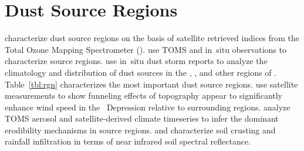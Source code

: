 \documentclass[12pt,twoside]{book}
\begin{document}
\section[Dust Source Regions]{Dust Source Regions}\label{sxn:rgn}
\cite{PGT02} characterize dust source regions on the basis of
satellite retrieved indices from the Total Ozone Mapping Spectrometer
().
\cite{WTM03} use TOMS and in~situ observations to characterize source
regions.
\cite{SZL01} use in~situ dust storm reports to analyze the climatology
and distribution of dust sources in the ,
, and other regions of .
Table~\ref{tbl:rgn} characterizes the most important dust source
regions. 
\cite{KoK04} use satellite measurements to show funneling effects of
topography appear to significantly enhance wind speed in the \Bodele\
Depression relative to surrounding regions.
\cite{ZeK05} analyze TOMS aerosol and satellite-derived climate
timeseries to infer the dominant erodibility mechanisms in source
regions. 
\cite{BGB04} and \cite{GBB04} characterize soil crusting and rainfall
infiltration in terms of near infrared soil spectral reflectance. 
\end{document}
